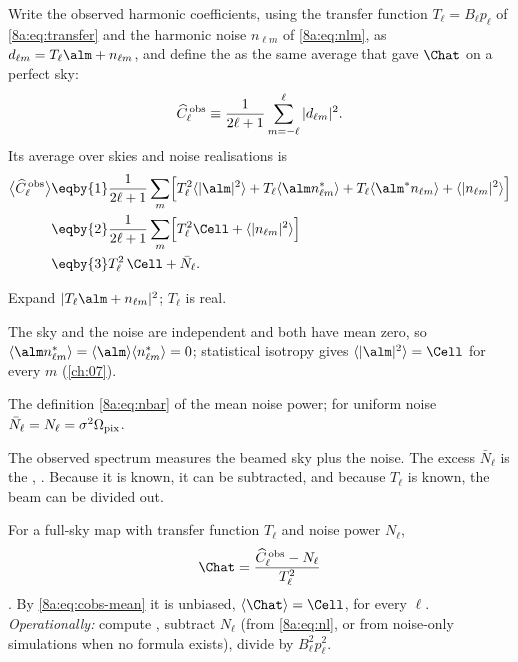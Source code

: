 Write the observed harmonic coefficients, using the transfer function $T_\ell=B_\ell p_\ell$ of
\eqref{8a:eq:transfer} and the harmonic noise $n_{\ell m}$ of \eqref{8a:eq:nlm}, as
$d_{\ell m}=T_\ell\alm+n_{\ell m}$, and define the  as the same
average that gave $\Chat$ on a perfect sky:
\begin{equation}
  \widehat C^{\,\rm obs}_\ell\equiv\frac{1}{2\ell+1}\sum_{m=-\ell}^{\ell}|d_{\ell m}|^2 .
  \label{8a:eq:cobs}
\end{equation}
Its average over skies and noise realisations is
\begin{align}
  \bigl\langle\widehat C^{\,\rm obs}_\ell\bigr\rangle
  &\eqby{1}\frac{1}{2\ell+1}\sum_m\Bigl[T_\ell^2\langle|\alm|^2\rangle
     +T_\ell\langle\alm n^*_{\ell m}\rangle+T_\ell\langle\alm^*n_{\ell m}\rangle
     +\langle|n_{\ell m}|^2\rangle\Bigr] \nonumber\\
  &\eqby{2}\frac{1}{2\ell+1}\sum_m\Bigl[T_\ell^2\Cell+\langle|n_{\ell m}|^2\rangle\Bigr] \nonumber\\
  &\eqby{3}T_\ell^2\,\Cell+\bar N_\ell .
  \label{8a:eq:cobs-mean}
\end{align}
\begin{explain}
  \item Expand $|T_\ell\alm+n_{\ell m}|^2$; $T_\ell$ is real.
  \item The sky and the noise are independent and both have mean zero, so
        $\langle\alm n^*_{\ell m}\rangle=\langle\alm\rangle\langle n^*_{\ell m}\rangle=0$;
        statistical isotropy gives $\langle|\alm|^2\rangle=\Cell$ for every $m$ (\cref{ch:07}).
  \item The definition \eqref{8a:eq:nbar} of the mean noise power; for uniform noise
        $\bar N_\ell=N_\ell=\sigma^2\Omega_{\rm pix}$.
\end{explain}
The observed spectrum measures the beamed sky plus the noise. The excess $\bar N_\ell$ is the
 , \cite{Knox1995}. Because it is known, it can be
subtracted, and because $T_\ell$ is known, the beam can be divided out.

\begin{workdef}
For a full-sky map with transfer function $T_\ell$ and noise power $N_\ell$,
\begin{equation}
  \Chat=\frac{\widehat C^{\,\rm obs}_\ell-N_\ell}{T_\ell^2}
  \label{8a:eq:chat}
\end{equation}
. By \eqref{8a:eq:cobs-mean} it is unbiased, $\langle\Chat\rangle=\Cell$, for every
$\ell$.
\emph{Operationally:} compute , subtract $N_\ell$ (from
\eqref{8a:eq:nl}, or from noise-only simulations when no formula exists), divide by
$B_\ell^2p_\ell^2$.
\end{workdef}

